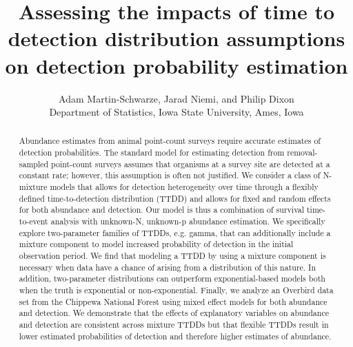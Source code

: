 \documentclass[12pt]{article}
\title{Assessing the impacts of time to detection distribution assumptions on detection probability estimation}
\author{Adam Martin-Schwarze, Jarad Niemi, and Philip Dixon\\
Department of Statistics, Iowa State University, Ames, Iowa}
\begin{document}
\maketitle
\newpage


\begin{abstract}

Abundance estimates from animal point-count surveys require accurate estimates of detection probabilities.  
The standard model for estimating detection from removal-sampled point-count surveys assumes that organisms at a survey site are detected at a constant rate; however, this assumption is often not justified.  
We consider a class of N-mixture models that allows for detection heterogeneity over time through a flexibly defined time-to-detection distribution (TTDD) and allows for fixed and random effects for both abundance and detection.
Our model is thus a combination of survival time-to-event analysis with unknown-N, unknown-p abundance estimation.  
We specifically explore two-parameter families of TTDDs, e.g. gamma, that can additionally include a mixture component to model increased probability of detection in the initial observation period.
We find that modeling a TTDD by using a mixture component is necessary when data have a chance of arising from a distribution of this nature.
In addition, two-parameter distributions can outperform exponential-based models both when the truth is exponential or non-exponential.
Finally, we analyze an Overbird data set from the Chippewa National Forest using mixed effect models for both abundance and detection.
We demonstrate that the effects of explanatory variables on abundance and detection are consistent across mixture TTDDs but that flexible TTDDs result in lower estimated probabilities of detection and therefore higher estimates of abundance. 

\end{abstract}
\end{document}
